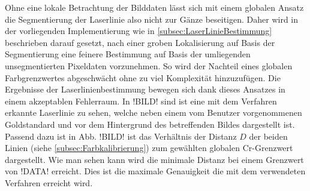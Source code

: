 Ohne eine lokale Betrachtung der Bilddaten lässt sich mit einem globalen Ansatz die Segmentierung der Laserlinie also nicht zur  Gänze beseitigen. Daher wird in der vorliegenden Implementierung wie in \ref{subsec:LaserLinieBestimmung} beschrieben darauf gesetzt, nach einer groben Lokalisierung auf Basis der Segmentierung eine feinere Bestimmung auf Basis der umliegenden unsegmentierten Pixeldaten vorzunehmen. So wird der Nachteil eines globalen Farbgrenzwertes abgeschwächt ohne zu viel Komplexität hinzuzufügen. Die Ergebnisse der Laserlinienbestimmung bewegen sich dank dieses Ansatzes in einem akzeptablen Fehlerraum. In !BILD! sind ist eine mit dem Verfahren erkannte Laserlinie zu sehen, welche neben einem vom Benutzer vorgenommenen Goldstandard und vor dem Hintergrund des betreffenden Bildes dargestellt ist. Passend dazu ist in Abb. !BILD! ist das Verhältnis der Distanz \(D\) der beiden Linien (siehe \ref{subsec:Farbkalibrierung}) zum gewählten globalen Cr-Grenzwert dargestellt. Wie man sehen kann wird die minimale Distanz bei einem Grenzwert von !DATA! erreicht. Dies ist die maximale Genauigkeit die mit dem verwendeten Verfahren erreicht wird.

